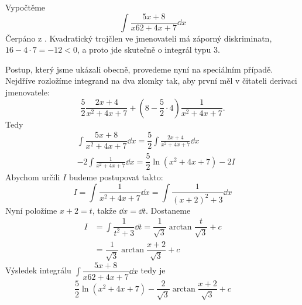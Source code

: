 \begin{mdframed}[style=mdexam]
  \begin{example}\label{mai:exam140}
    Vypočtěme 
    \begin{equation*}
      \int\dfrac{5x+8}{x62+4x+7}\dd{x}
    \end{equation*}
    Čerpáno z \cite[s.~73]{Knichal}.  Kvadratický trojčlen ve jmenovateli má záporný diskriminatn,
    \(16-4\cdot7 = -12<0\), a proto jde skutečně o integrál typu 3.
    
    Postup, který jsme ukázali obecně, provedeme nyní na speciálním případě. Nejdříve rozložíme
    integrand na dva zlomky tak, aby první měl v čitateli derivaci jmenovatele: 
    \begin{equation*}
      \frac{5}{2}\frac{2x+4}{x^2+4x+7} + \left(8-\frac{5}{2}\cdot4\right)\frac{1}{x^2+4x+7}.
    \end{equation*}
    Tedy
    \begin{align*}
      & \int\dfrac{5x+8}{x^2+4x+7}\dd{x}  = \dfrac{5}{2}\int\frac{2x+4}{x^2+4x+7}\dd{x}  \\
      &-2\int\frac{1}{x^2+4x+7}\dd{x}     = \dfrac{5}{2}\ln(x^2+4x+7) - 2I
    \end{align*}
    Abychom určili \(I\) budeme postupovat takto:
    \begin{equation*}
      I = \int\dfrac{1}{x^2+4x+7}\dd{x} = \int\dfrac{1}{(x+2)^2+3}\dd{x} 
    \end{equation*}
    Nyní položíme \(x+2=t\), takže \(\dd{x}= \dd{t}\). Dostaneme
    \begin{align*}
      I &= \int\dfrac{1}{t^2+3}\dd{t} = \dfrac{1}{\sqrt{3}}\arctan\dfrac{t}{\sqrt{3}} + c \\
        &= \dfrac{1}{\sqrt{3}}\arctan\dfrac{x+2}{\sqrt{3}} + c
    \end{align*}
    Výsledek integrálu \(\int\dfrac{5x+8}{x62+4x+7}\dd{x}\) tedy je 
    \begin{equation*}
      \dfrac{5}{2}\ln(x^2+4x+7) - \dfrac{2}{\sqrt{3}}\arctan\dfrac{x+2}{\sqrt{3}} + c
    \end{equation*}
  \end{example}
\end{mdframed}